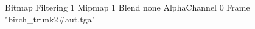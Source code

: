 {Bitmap
	{Filtering 1}
	{Mipmap 1}
	{Blend none}
	{AlphaChannel 0}
	{Frame "birch_trunk2#aut.tga"}
}
